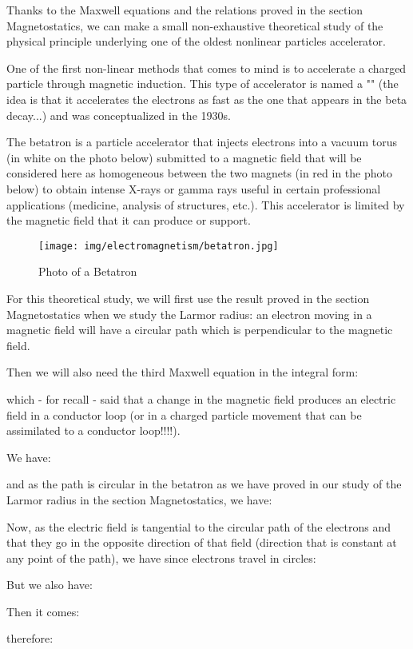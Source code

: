 	Thanks to the Maxwell equations and the relations proved in the section Magnetostatics, we can make a small non-exhaustive theoretical study of the physical principle underlying one of the oldest nonlinear particles accelerator.
	
	One of the first non-linear methods that comes to mind is to accelerate a charged particle through magnetic induction. This type of accelerator is named a "" (the idea is that it accelerates the electrons as fast as the one that appears in the beta decay...) and was conceptualized in the 1930s.	
	
	The betatron is a particle accelerator that injects electrons into a vacuum torus (in white on the photo below) submitted to a magnetic field that will be considered here as homogeneous between the two magnets (in red in the photo below) to obtain intense X-rays or gamma rays useful in certain professional applications (medicine, analysis of structures, etc.). This accelerator is limited by the magnetic field that it can produce or support.
	\begin{figure}[H]
		\centering
		\texttt{[image: img/electromagnetism/betatron.jpg]}
		\caption{Photo of a Betatron}
	\end{figure}
	For this theoretical study, we will first use the result proved in the section Magnetostatics when we study the Larmor radius: an electron moving in a magnetic field will have a circular path which is perpendicular to the magnetic field.
	
	Then we will also need the third Maxwell equation in the integral form:
	
	which - for recall - said that a change in the magnetic field produces an electric field in a conductor loop (or in a charged particle movement that can be assimilated to a conductor loop!!!!).
	
	We have:
	
	and as the path is circular in the betatron as we have proved in our study of the Larmor radius in the section Magnetostatics, we have:
	
	Now, as the electric field is tangential to the circular path of the electrons and that they go in the opposite direction of that field (direction that is constant at any point of the path), we have since electrons travel in circles:
	
	But we also have:
	
	Then it comes:
	
	therefore:
	
